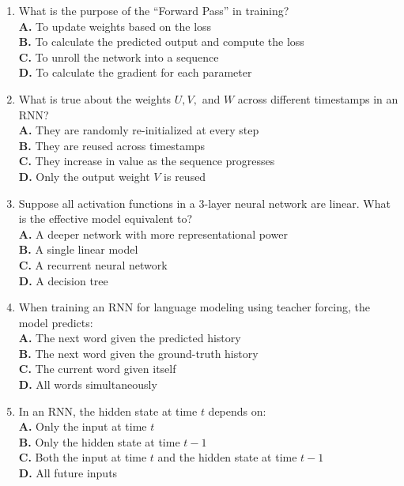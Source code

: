 \documentclass[11pt]{article}
\begin{document}
\begin{enumerate}[label=Q\arabic*., leftmargin=*]
\item What is the purpose of the ``Forward Pass'' in training?\\[0.25em]
\textbf{A.} To update weights based on the loss\\
\textbf{B.} To calculate the predicted output and compute the loss\\
\textbf{C.} To unroll the network into a sequence\\
\textbf{D.} To calculate the gradient for each parameter

\item What is true about the weights $U, V,$ and $W$ across different timestamps in an RNN?\\[0.25em]
\textbf{A.} They are randomly re-initialized at every step\\
\textbf{B.} They are reused across timestamps\\
\textbf{C.} They increase in value as the sequence progresses\\
\textbf{D.} Only the output weight $V$ is reused

\item Suppose all activation functions in a 3-layer neural network are linear. What is the effective model equivalent to?\\[0.25em]
\textbf{A.} A deeper network with more representational power\\
\textbf{B.} A single linear model\\
\textbf{C.} A recurrent neural network\\
\textbf{D.} A decision tree

\item When training an RNN for language modeling using teacher forcing, the model predicts:\\[0.25em]
\textbf{A.} The next word given the predicted history\\
\textbf{B.} The next word given the ground-truth history\\
\textbf{C.} The current word given itself\\
\textbf{D.} All words simultaneously

\item In an RNN, the hidden state at time $t$ depends on:\\[0.25em]
\textbf{A.} Only the input at time $t$\\
\textbf{B.} Only the hidden state at time $t-1$\\
\textbf{C.} Both the input at time $t$ and the hidden state at time $t-1$\\
\textbf{D.} All future inputs


\end{enumerate}
\end{document}
